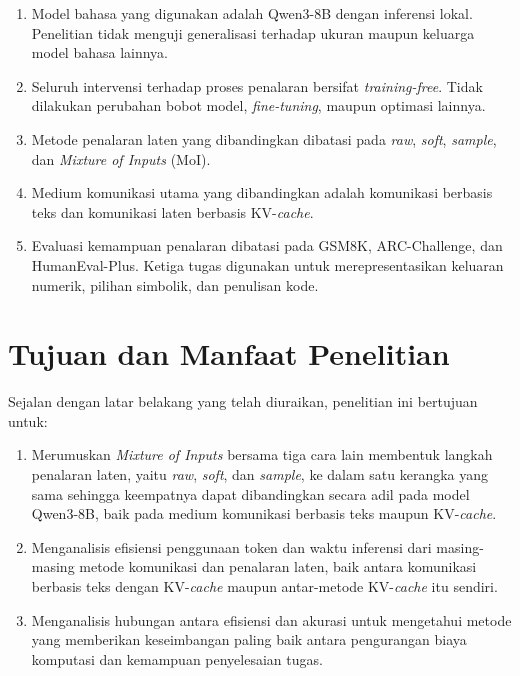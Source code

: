\begin{enumerate}

\item Model bahasa yang digunakan adalah Qwen3-8B dengan inferensi lokal.
      Penelitian tidak menguji generalisasi terhadap ukuran maupun keluarga
      model bahasa lainnya.

\item Seluruh intervensi terhadap proses penalaran bersifat
      \textit{training-free}. Tidak dilakukan perubahan bobot model,
      \textit{fine-tuning}, maupun optimasi lainnya.

\item Metode penalaran laten yang dibandingkan dibatasi pada
      \textit{raw}, \textit{soft}, \textit{sample}, dan
      \textit{Mixture of Inputs} (MoI).

\item Medium komunikasi utama yang dibandingkan adalah komunikasi berbasis
      teks dan komunikasi laten berbasis KV-\textit{cache}.

\item Evaluasi kemampuan penalaran dibatasi pada GSM8K,
      ARC-Challenge, dan HumanEval-Plus. Ketiga tugas digunakan untuk
      merepresentasikan keluaran numerik, pilihan simbolik, dan
      penulisan kode.

\end{enumerate}


\section{Tujuan dan Manfaat Penelitian}

Sejalan dengan latar belakang yang telah diuraikan, penelitian ini bertujuan untuk:

\begin{enumerate}

      \item Merumuskan \textit{Mixture of Inputs} bersama tiga cara lain
            membentuk langkah penalaran laten, yaitu \textit{raw},
            \textit{soft}, dan \textit{sample}, ke dalam satu kerangka yang
            sama sehingga keempatnya dapat dibandingkan secara adil pada model
            Qwen3-8B, baik pada medium komunikasi berbasis teks maupun
            KV-\textit{cache}.

      \item Menganalisis efisiensi penggunaan token dan waktu inferensi dari
            masing-masing metode komunikasi dan penalaran laten, baik
            antara komunikasi berbasis teks dengan KV-\textit{cache} maupun antar-metode
            KV-\textit{cache} itu sendiri.

      \item Menganalisis hubungan antara efisiensi dan akurasi untuk
            mengetahui metode yang memberikan keseimbangan paling baik antara
            pengurangan biaya komputasi dan kemampuan penyelesaian tugas.

\end{enumerate}


